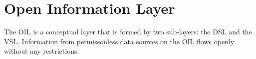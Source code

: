\section{Open Information Layer}

The \gls{OIL} is a conceptual layer that is formed by two sub-layers: the \gls{DSL} and the \gls{VSL}. Information from permissonless data sources on the \gls{OIL} flows openly without any restrictions.






